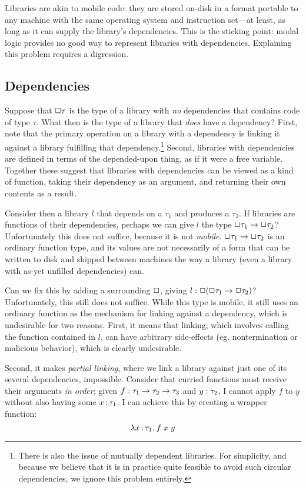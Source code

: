 \documentclass[11pt]{article}
\begin{document}
Libraries are akin to mobile code: they are stored on-disk in a format portable
to any machine with the same operating system and instruction set---at least, as
long as it can supply the library's dependencies. This is the sticking point:
modal logic provides no good way to represent libraries with dependencies.
Explaining this problem requires a digression.

\subsection{Dependencies}

Suppose that $\Box \tau$ is the type of a library with \emph{no} dependencies
that contains code of type $\tau$. What then is the type of a library that
\emph{does} have a dependency? First, note that the primary operation on a
library with a dependency is linking it against a library fulfilling that
dependency.\footnote{There is also the issue of mutually dependent libraries.
  For simplicity, and because we believe that it is in practice quite feasible
  to avoid such circular dependencies, we ignore this problem entirely.} Second,
libraries with dependencies are defined in terms of the depended-upon thing, as
if it were a free variable. Together these suggest that libraries with
dependencies can be viewed as a kind of function, taking their dependency as an
argument, and returning their own contents as a result.

Consider then a library $l$ that depends on a $\tau_1$ and produces a $\tau_2$.
If libraries are functions of their dependencies, perhaps we can give $l$ the
type $\Box \tau_1 \to \Box \tau_2$? Unfortunately this does not suffice, because
it is not \emph{mobile}. $\Box \tau_1 \to \Box \tau_2$ is an ordinary function
type, and its values are not necessarily of a form that can be written to disk
and shipped between machines the way a library (even a library with as-yet
unfilled dependencies) can.

Can we fix this by adding a surrounding $\Box$, giving $l : \Box(\Box \tau_1
\to \Box \tau_2)$? Unfortunately, this still does not suffice. While this type
is mobile, it still uses an ordinary function as the mechanism for linking
against a dependency, which is undesirable for two reasons. First, it means that
linking, which involves calling the function contained in $l$, can have
arbitrary side-effects (eg. nontermination or malicious behavior), which is
clearly undesirable.

Second, it makes \emph{partial linking}, where we link a library against just
one of its several dependencies, impossible. Consider that curried functions
must receive their arguments \emph{in order}; given $f : \tau_1 \to \tau_2
\to \tau_3$ and $y : \tau_2$, I cannot apply $f$ to $y$ without also having
some $x \mathop{:} \tau_1$. I can achieve this by creating a wrapper function:
\[ \lambda x \mathop{:} \tau_1 .\: f \; x \; y \]
\end{document}
